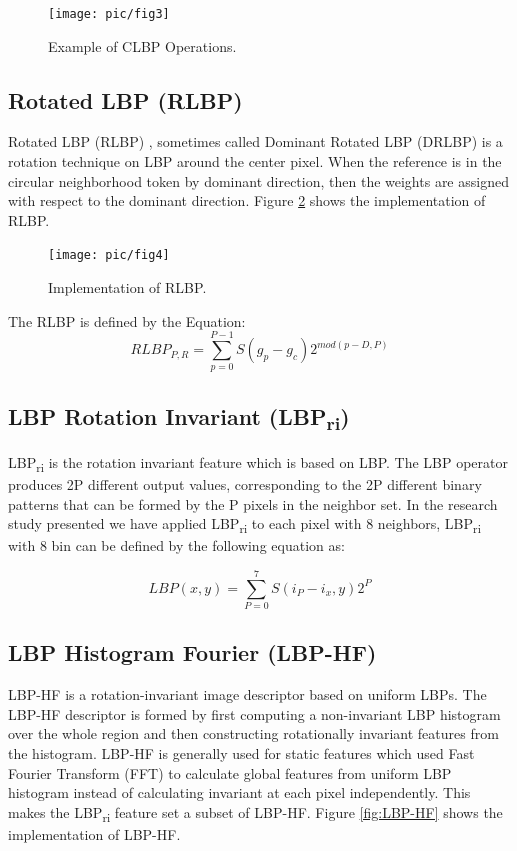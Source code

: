 \documentclass[review]{elsarticle}
\begin{document}
\begin{figure}[h!]
	\centering
	\texttt{[image: pic/fig3]}
	\caption{Example of CLBP Operations.}
	\label{fig:CLBP}
\end{figure}

\subsection{Rotated LBP (RLBP)}
\label{subsec:RLBP}
Rotated LBP (RLBP) \cite{Mehta2013}, sometimes called Dominant Rotated LBP (DRLBP) \cite{Mehta2016} is a rotation technique on LBP around the center pixel. When the reference is in the circular neighborhood token by dominant direction, then the weights are assigned with respect to the dominant direction. Figure \ref{fig:RLBP} shows the implementation of RLBP. 

\begin{figure}[h!]
	\centering
	\texttt{[image: pic/fig4]}
	\caption{Implementation of RLBP.}
	\label{fig:RLBP}
\end{figure}
The RLBP is defined by the Equation:\\
\begin{equation}
RLBP_{P,R} = \sum_{p=0}^{P-1} S(g_p - g_c)2^{mod(p-D,P)}
\end{equation}

\subsection{LBP Rotation Invariant (LBP\textsubscript{ri})}
\label{subsec:LBPri}
LBP\textsubscript{ri} is the rotation invariant feature which is based on LBP. The LBP operator produces 2P different output values, corresponding to the 2P different binary patterns that can be formed by the P pixels in the neighbor set. In the research study presented we have applied LBP\textsubscript{ri} to each pixel with 8 neighbors, LBP\textsubscript{ri} with 8 bin can be defined by the following equation as:

\begin{equation}
LBP(x,y) = \sum_{P=0}^{7} S(i_P - i_x,y)2^P
\end{equation}

\subsection{LBP Histogram Fourier (LBP-HF)}
\label{subsec:LBP-hf}
LBP-HF is a rotation-invariant image descriptor based on uniform LBPs. The LBP-HF descriptor is formed by first computing a non-invariant LBP histogram over the whole region and then constructing rotationally invariant features from the histogram. LBP-HF is generally used for static features which used Fast Fourier Transform (FFT) to calculate global features from uniform LBP histogram instead of calculating invariant at each pixel independently. This makes the LBP\textsubscript{ri} feature set a subset of LBP-HF. Figure \ref{fig:LBP-HF} shows the implementation of LBP-HF. 
\end{document}
